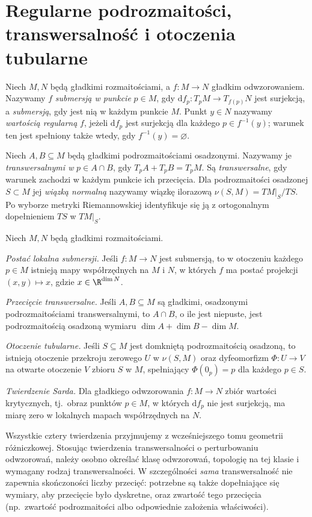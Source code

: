 \section{Regularne podrozmaitości, transwersalność i otoczenia tubularne}
\begin{definicja}
Niech $M,N$ będą gładkimi rozmaitościami, a
$f:M\to N$ gładkim odwzorowaniem.
Nazywamy $f$ \emph{submersją w punkcie} $p\in M$,
gdy $\mathrm df_p:T_pM\to T_{f(p)}N$ jest surjekcją,
a \emph{submersją}, gdy jest nią w każdym punkcie $M$.
Punkt $y\in N$ nazywamy \emph{wartością regularną} $f$,
jeżeli $\mathrm df_p$ jest surjekcją dla każdego
$p\in f^{-1}(y)$; warunek ten jest spełniony także
wtedy, gdy $f^{-1}(y)=\varnothing$.

Niech $A,B\subseteq M$ będą gładkimi podrozmaitościami
osadzonymi. Nazywamy je \emph{transwersalnymi w}
$p\in A\cap B$, gdy $T_pA+T_pB=T_pM$.
Są \emph{transwersalne}, gdy warunek zachodzi
w każdym punkcie ich przecięcia.
Dla podrozmaitości osadzonej $S\subset M$
jej \emph{wiązką normalną} nazywamy
wiązkę ilorazową $\nu(S,M)=TM|_S/TS$.
Po wyborze metryki Riemannowskiej identyfikuje się
ją z ortogonalnym dopełnieniem $TS$ w $TM|_S$.
\end{definicja}

\begin{twierdzenie}
Niech $M,N$ będą gładkimi rozmaitościami.

\emph{Postać lokalna submersji.}
Jeśli $f:M\to N$ jest submersją, to
w otoczeniu każdego $p\in M$ istnieją mapy
współrzędnych na $M$ i $N$, w których $f$
ma postać projekcji $(x,y)\mapsto x$,
gdzie $x\in\R^{\dim N}$.

\emph{Przecięcie transwersalne.}
Jeśli $A,B\subseteq M$ są gładkimi,
osadzonymi podrozmaitościami transwersalnymi,
to $A\cap B$, o ile jest niepuste,
jest podrozmaitością osadzoną wymiaru
$\dim A+\dim B-\dim M$.

\emph{Otoczenie tubularne.}
Jeśli $S\subseteq M$ jest domkniętą
podrozmaitością osadzoną, to istnieją
otoczenie przekroju zerowego $U$ w $\nu(S,M)$
oraz dyfeomorfizm $\Phi:U\to V$ na otwarte
otoczenie $V$ zbioru $S$ w $M$,
spełniający $\Phi(0_p)=p$ dla każdego $p\in S$.

\emph{Twierdzenie Sarda.}
Dla gładkiego odwzorowania $f:M\to N$
zbiór wartości krytycznych, tj.\ obraz punktów
$p\in M$, w których $\mathrm df_p$ nie jest
surjekcją, ma miarę zero w lokalnych mapach
współrzędnych na $N$.
\end{twierdzenie}
\begin{uwaga}
Wszystkie cztery twierdzenia przyjmujemy
z wcześniejszego tomu geometrii różniczkowej.
Stosując twierdzenia transwersalności o
perturbowaniu odwzorowań, należy osobno
określać klasę odwzorowań, topologię
na tej klasie i wymagany rodzaj transwersalności.
W szczególności \emph{sama} transwersalność
nie zapewnia skończoności liczby przecięć:
potrzebne są także dopełniające się wymiary,
aby przecięcie było dyskretne, oraz zwartość
tego przecięcia (np.\ zwartość podrozmaitości
albo odpowiednie założenia właściwości).
\end{uwaga}

